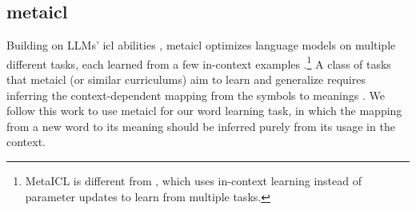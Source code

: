 \subsection{\acl{metaicl}}
Building on LLMs' \acl{icl} abilities \citep{GPT3}, \acf{metaicl} optimizes language models on multiple different tasks, each learned from a few in-context examples \citep{min-etal-2022-metaicl,chen-etal-2022-meta}.\footnote{MetaICL is different from \citet{cf-metaicl-2023}, which uses in-context learning instead of parameter updates to learn from multiple tasks.}
A class of tasks that \ac{metaicl} (or similar curriculums) aim to learn and generalize requires inferring the context-dependent mapping from the symbols to meanings \citep{Lake2023HumanlikeSG,huang2024lexinvariant,Anand2024DualPL,Park2024ICLR}.
We follow this work to use \ac{metaicl} for our word learning task, in which the mapping from a new word to its meaning should be inferred purely from its usage in the context.




